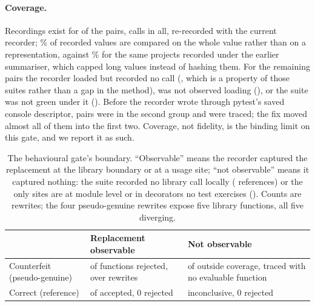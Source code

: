 \documentclass[11pt]{article}
\begin{document}
\paragraph{Coverage.}
Recordings exist for \nTracedPairs{} of the \nPairs{} pairs, \nTraceCalls{} calls in all, re-recorded with the current recorder; \fidelityWhole\% of recorded values are compared on the whole value rather than on a representation, against \fidelityWholeBefore\% for the same projects recorded under the earlier summariser, which capped long values instead of hashing them.
For the remaining pairs the recorder loaded but recorded no call (\nRecLoadedNoCall, which is a property of those suites rather than a gap in the method), was not observed loading (\nRecNotObserved), or the suite was not green under it (\nRecNotGreen).
Before the recorder wrote through pytest's saved console descriptor, \nRecNotObservedOld{} pairs were in the second group and \nTracedPairsOld{} were traced; the fix moved almost all of them into the first two.
Coverage, not fidelity, is the binding limit on this gate, and we report it as such.


\begin{table}[t]
\centering
\small
\setlength{\tabcolsep}{4pt}
\begin{tabular}{p{1.75cm}p{2.3cm}p{2.3cm}}
\hline
 & \textbf{Replacement observable} & \textbf{Not observable} \\
\hline
Counterfeit (pseudo-genuine) & \nPseudoFunctions{} of \nPseudoFunctions{} functions rejected, over \nPseudoEvaluable{} rewrites & \nPseudoOutside{} of \nPseudo{} outside coverage, \nPseudoCannotSpeak{} traced with no evaluable function \\
Correct (reference) & \nRefsAccepted{} of \nRefsAccepted{} accepted, 0 rejected & \nRefsInconclusive{} inconclusive, 0 rejected \\
\hline
\end{tabular}
\caption{The behavioural gate's boundary. ``Observable'' means the recorder captured the replacement at the library boundary or at a usage site; ``not observable'' means it captured nothing: the suite recorded no library call locally (\nRefsNoCalls{} references) or the only sites are at module level or in decorators no test exercises (\nRefsNotObservable). Counts are rewrites; the four pseudo-genuine rewrites expose five library functions, all five diverging.}
\label{tab:boundary}
\end{table}
\end{document}
